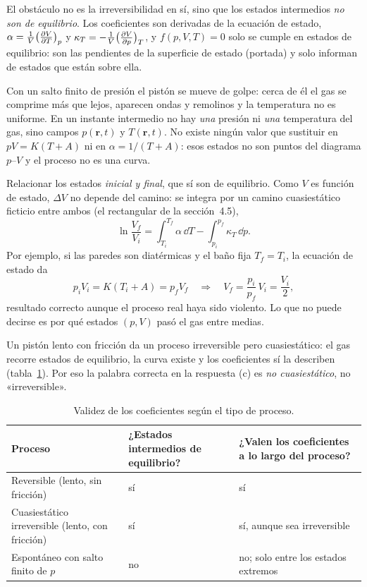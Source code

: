 \begin{observacion}
El obstáculo no es la irreversibilidad en sí, sino que los estados intermedios \emph{no son de
equilibrio}. Los coeficientes son derivadas de la ecuación de estado,
$\alpha=\frac1V\bigl(\tfrac{\partial V}{\partial T}\bigr)_{p}$ y $\kappa_T=-\frac1V\bigl(\tfrac{\partial V}{\partial p}\bigr)_{T}$, y $f(p,V,T)=0$ solo se cumple en
estados de equilibrio: son las pendientes de la superficie de estado (portada) y solo informan de
estados que están sobre ella.

 Con un salto finito de presión el pistón se mueve de golpe: cerca
de él el gas se comprime más que lejos, aparecen ondas y remolinos y la temperatura no es uniforme. En
un instante intermedio no hay \emph{una} presión ni \emph{una} temperatura del gas, sino campos
$p(\mathbf r,t)$ y $T(\mathbf r,t)$. No existe ningún valor que sustituir en $pV=K(T+A)$ ni en
$\alpha=1/(T+A)$: esos estados no son puntos del diagrama $p$--$V$ y el proceso no es una curva.

 Relacionar los estados \emph{inicial y final}, que sí son de equilibrio.
Como $V$ es función de estado, $\Delta V$ no depende del camino: se integra por un camino cuasiestático
ficticio entre ambos (el rectangular de la sección~4.5),
\[
  \ln\frac{V_f}{V_i}=\int_{T_i}^{T_f}\alpha\,\dd T-\int_{p_i}^{p_f}\kappa_T\,\dd p .
\]
Por ejemplo, si las paredes son diatérmicas y el baño fija $T_f=T_i$, la ecuación de estado da
\[
  p_iV_i=K(T_i+A)=p_fV_f\quad\Longrightarrow\quad V_f=\frac{p_i}{p_f}\,V_i=\frac{V_i}{2},
\]
resultado correcto aunque el proceso real haya sido violento. Lo que no puede decirse es por qué
estados $(p,V)$ pasó el gas entre medias.

 Un pistón lento con fricción da un proceso
irreversible pero cuasiestático: el gas recorre estados de equilibrio, la curva existe y los
coeficientes sí la describen (tabla~\ref{tab:cuasi}). Por eso la palabra correcta en la respuesta (c)
es \emph{no cuasiestático}, no «irreversible».
\end{observacion}

\begin{table}[htbp]
\centering
\caption{Validez de los coeficientes según el tipo de proceso.}
\label{tab:cuasi}
\small
\begin{tabularx}{\textwidth}{>{\raggedright\arraybackslash}X>{\raggedright\arraybackslash}p{3.4cm}>{\raggedright\arraybackslash}p{4.6cm}}
\toprule
Proceso & ¿Estados intermedios de equilibrio? & ¿Valen los coeficientes a lo largo del proceso?\\
\midrule
Reversible (lento, sin fricción) & sí & sí\\
Cuasiestático irreversible (lento, con fricción) & sí & sí, aunque sea irreversible\\
Espontáneo con salto finito de $p$ & no & no; solo entre los estados extremos\\
\bottomrule
\end{tabularx}
\end{table}


